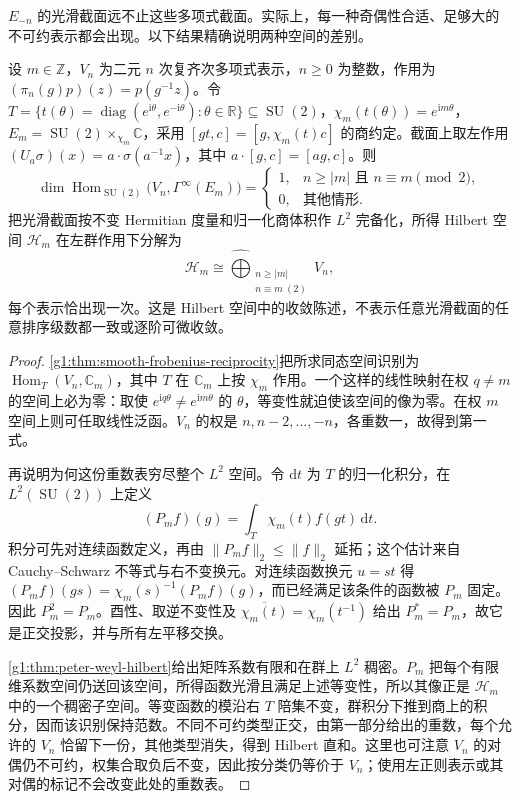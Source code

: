 \(E_{-n}\) 的光滑截面远不止这些多项式截面。实际上，每一种奇偶性合适、足够大的不可约表示都会出现。以下结果精确说明两种空间的差别。

\begin{proposition}\label{g1:prop:sphere-line-section-multiplicity}
	设 \(m\in\mathbb Z\)，\(V_n\) 为二元 \(n\) 次复齐次多项式表示，\(n\ge0\) 为整数，作用为 \((\pi_n(g)p)(z)=p(g^{-1}z)\)。令 \(T=\{t(\theta)=\operatorname{diag}(e^{\mathrm{i}\theta},e^{-\mathrm{i}\theta}):\theta\in\mathbb R\}\subseteq\operatorname{SU}(2)\)，\(\chi_m(t(\theta))=e^{\mathrm{i}m\theta}\)，\(E_m=\operatorname{SU}(2)\times_{\chi_m}\mathbb C\)，采用 \([gt,c]=[g,\chi_m(t)c]\) 的商约定。截面上取左作用 \((U_a\sigma)(x)=a\cdot\sigma(a^{-1}x)\)，其中 \(a\cdot[g,c]=[ag,c]\)。则
	\[
		\dim\operatorname{Hom}_{\operatorname{SU}(2)}
		\bigl(V_n,\Gamma^\infty(E_m)\bigr)
		=\begin{cases}
			1,& n\ge|m|\text{ 且 }n\equiv m\pmod2,\\
			0,&\text{其他情形}.
		\end{cases}
	\]
	把光滑截面按不变 Hermitian 度量和归一化商体积作 \(L^2\) 完备化，所得 Hilbert 空间 \(\mathcal H_m\) 在左群作用下分解为
	\[
		\mathcal H_m\cong
		\widehat{\bigoplus}_{\substack{n\ge|m|\\n\equiv m\ (2)}}V_n,
	\]
	每个表示恰出现一次。这是 Hilbert 空间中的收敛陈述，不表示任意光滑截面的任意排序级数都一致或逐阶可微收敛。
\end{proposition}
\begin{proof}
	\cref{g1:thm:smooth-frobenius-reciprocity}把所求同态空间识别为 \(\operatorname{Hom}_T(V_n,\mathbb C_m)\)，其中 \(T\) 在 \(\mathbb C_m\) 上按 \(\chi_m\) 作用。一个这样的线性映射在权 \(q\ne m\) 的空间上必为零：取使 \(e^{\mathrm{i}q\theta}\ne e^{\mathrm{i}m\theta}\) 的 \(\theta\)，等变性就迫使该空间的像为零。在权 \(m\) 空间上则可任取线性泛函。\(V_n\) 的权是 \(n,n-2,\ldots,-n\)，各重数一，故得到第一式。

	再说明为何这份重数表穷尽整个 \(L^2\) 空间。令 \(\mathrm{d}t\) 为 \(T\) 的归一化积分，在 \(L^2(\operatorname{SU}(2))\) 上定义
	\[
		(P_m f)(g)=\int_T\chi_m(t)f(gt)\,\mathrm{d}t.
	\]
	积分可先对连续函数定义，再由 \(\|P_mf\|_2\le\|f\|_2\) 延拓；这个估计来自 Cauchy--Schwarz 不等式与右不变换元。对连续函数换元 \(u=st\) 得 \((P_mf)(gs)=\chi_m(s)^{-1}(P_mf)(g)\)，而已经满足该条件的函数被 \(P_m\) 固定。因此 \(P_m^2=P_m\)。酉性、取逆不变性及 \(\overline{\chi_m(t)}=\chi_m(t^{-1})\) 给出 \(P_m^*=P_m\)，故它是正交投影，并与所有左平移交换。

	\cref{g1:thm:peter-weyl-hilbert}给出矩阵系数有限和在群上 \(L^2\) 稠密。\(P_m\) 把每个有限维系数空间仍送回该空间，所得函数光滑且满足上述等变性，所以其像正是 \(\mathcal H_m\) 中的一个稠密子空间。等变函数的模沿右 \(T\) 陪集不变，群积分下推到商上的积分，因而该识别保持范数。不同不可约类型正交，由第一部分给出的重数，每个允许的 \(V_n\) 恰留下一份，其他类型消失，得到 Hilbert 直和。这里也可注意 \(V_n\) 的对偶仍不可约，权集合取负后不变，因此按分类仍等价于 \(V_n\)；使用左正则表示或其对偶的标记不会改变此处的重数表。
\end{proof}


